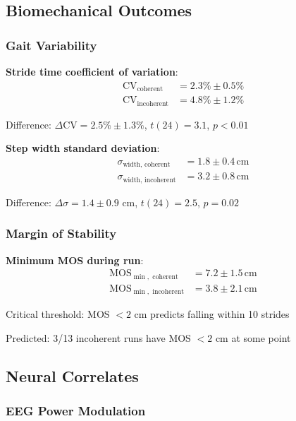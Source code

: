 \documentclass[11pt,onecolumn]{article}
\begin{document}
\subsection{Biomechanical Outcomes}

\subsubsection{Gait Variability}

\textbf{Stride time coefficient of variation}:
\begin{align}
\text{CV}_{\text{coherent}} &= 2.3\% \pm 0.5\% \\
\text{CV}_{\text{incoherent}} &= 4.8\% \pm 1.2\%
\end{align}

Difference: $\Delta\text{CV} = 2.5\% \pm 1.3\%$, $t(24) = 3.1$, $p < 0.01$

\textbf{Step width standard deviation}:
\begin{align}
\sigma_{\text{width, coherent}} &= 1.8 \pm 0.4\,\text{cm} \\
\sigma_{\text{width, incoherent}} &= 3.2 \pm 0.8\,\text{cm}
\end{align}

Difference: $\Delta\sigma = 1.4 \pm 0.9$ cm, $t(24) = 2.5$, $p = 0.02$

\subsubsection{Margin of Stability}

\textbf{Minimum MOS during run}:
\begin{align}
\text{MOS}_{\min,\text{ coherent}} &= 7.2 \pm 1.5\,\text{cm} \\
\text{MOS}_{\min,\text{ incoherent}} &= 3.8 \pm 2.1\,\text{cm}
\end{align}

Critical threshold: MOS $< 2$ cm predicts falling within 10 strides

Predicted: 3/13 incoherent runs have MOS $< 2$ cm at some point

\subsection{Neural Correlates}

\subsubsection{EEG Power Modulation}
\end{document}
